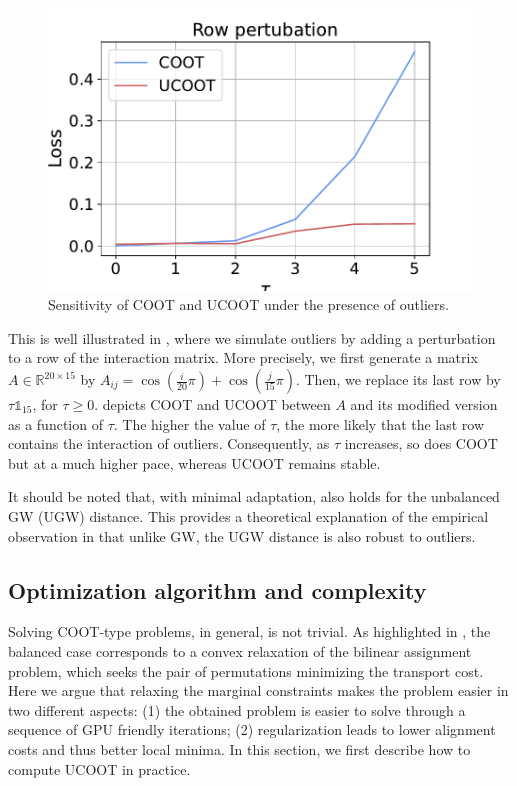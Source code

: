 \setlength{\columnsep}{10pt}%
\setlength{\intextsep}{0pt}
\begin{figure}
  \centering
  \vspace{-10pt}
  \includegraphics[width=\linewidth]{./Chapitre3/fig/robustness_2.pdf}
  \caption{Sensitivity of COOT and UCOOT under the presence of outliers.
  \label{fig:robust}}
\end{figure}
This is well illustrated in ,
where we simulate outliers by adding a perturbation to a row of the interaction matrix.
More precisely, we first generate a matrix $A \in \mathbb R^{20 \times 15}$ by
$A_{ij} = \cos(\frac{i}{20} \pi) + \cos(\frac{j}{15} \pi)$.
Then, we replace its last row by $\tau \mathds 1_{15}$, for $\tau \geq 0$.
 depicts COOT and UCOOT between $A$
and its modified version as a function of $\tau$. The higher the value of $\tau$,
the more likely that the last row contains the interaction of outliers.
Consequently, as $\tau$ increases, so does COOT but at a much higher pace,
whereas UCOOT remains stable.

It should be noted that, with minimal adaptation, 
also holds for the unbalanced GW (UGW) distance.
This provides a theoretical explanation of the empirical observation in \citep{Sejourne20}
that unlike GW, the UGW distance is also robust to outliers.

\subsection{Optimization algorithm and complexity} \label{subsec_app:algo}
Solving COOT-type problems, in general, is not trivial. As highlighted in \citep{Redko20},
the balanced case corresponds to a convex relaxation of the bilinear assignment problem,
which seeks the pair of permutations minimizing the transport cost.
Here we argue that relaxing the marginal constraints makes the problem easier
in two different aspects: (1) the obtained problem is easier to solve
through a sequence of GPU friendly iterations; (2) regularization leads to lower alignment costs
and thus better local minima. In this section, we first describe how to compute UCOOT in practice.

